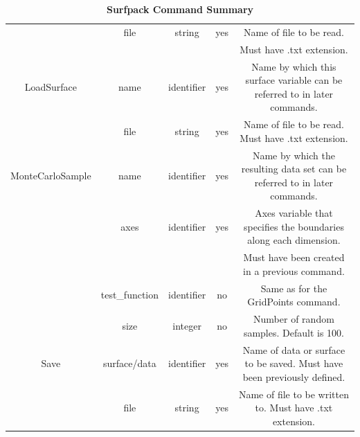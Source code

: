 \documentclass{article}
\begin{document}
\begin{table}
\begin{tabular}{|c|c|c|c|c|}
    & file & string & yes & Name of file to be read.\\
    & & & & Must have .txt extension.\\
    \hline
    LoadSurface & name & identifier & yes & Name by which
    this surface variable can be referred to in later commands.\\
    \hline
    & file & string & yes & Name of file to be read.  Must have .txt
    extension.\\
    \hline
    MonteCarloSample & name & identifier & yes & Name by
    which the resulting data set can be referred to in later commands.\\
    \hline
    & axes & identifier & yes & Axes variable that specifies the
    boundaries along each dimension.\\
    & & & & Must have been created in a previous command.\\
    \hline
    & test\_function & identifier & no & Same as for the
    GridPoints command.\\
    \hline
    & size & integer & no & Number of random samples.  Default is
    100.\\
    \hline
    Save & surface/data & identifier & yes & Name of data or
    surface to be saved.  Must have been previously defined.\\
    \hline
    & file & string & yes & Name of file to be written to.  Must have .txt
    extension.\\
    \hline
  \end{tabular}
  \caption{\textbf{Surfpack Command Summary}}
\end{table}
\end{document}
